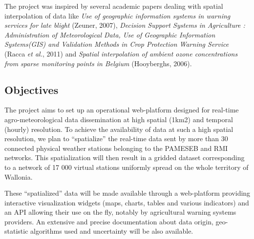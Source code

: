 \documentclass[12pt,twoside]{reedthesis}
\theoremstyle{definition}
\theoremstyle{definition}
\theoremstyle{definition}
\theoremstyle{remark}
\begin{document}
The project was inspired by several academic papers dealing with spatial
interpolation of data like \emph{Use of geographic information systems
in warning services for late blight} (Zeuner, 2007), \emph{Decision
Support Systems in Agriculture : Administration of Meteorological Data,
Use of Geographic Information Systems(GIS) and Validation Methods in
Crop Protection Warning Service} (Racca \emph{et al.}, 2011) and
\emph{Spatial interpolation of ambient ozone concentrations from sparse
monitoring points in Belgium} (Hooyberghs, 2006).

\subsection{Objectives}\label{objectives}

The project aims to set up an operational web-platform designed for
real-time agro-meteorological data dissemination at high spatial (1km2)
and temporal (hourly) resolution. To achieve the availability of data at
such a high spatial resolution, we plan to ``spatialize'' the real-time
data sent by more than 30 connected physical weather stations belonging
to the PAMESEB and RMI networks. This spatialization will then result in
a gridded dataset corresponding to a network of 17 000 virtual stations
uniformly spread on the whole territory of Wallonia.

These ``spatialized'' data will be made available through a web-platform
providing interactive visualization widgets (maps, charts, tables and
various indicators) and an API allowing their use on the fly, notably by
agricultural warning systems providers. An extensive and precise
documentation about data origin, geo-statistic algorithms used and
uncertainty will be also available.

~
\end{document}
